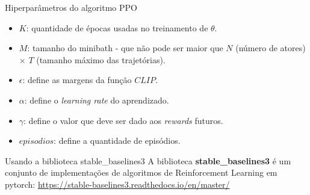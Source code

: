 \documentclass{beamer}
\begin{document}
\begin{frame}{Hiperparâmetros do algoritmo PPO}
	\begin{itemize}
		\item $K$: quantidade de épocas usadas no treinamento de $\theta$.
		\item $M$: tamanho do minibath - que não pode ser maior que $N$ (número de atores) $\times$ $T$ (tamanho máximo das trajetórias).
		\item $\epsilon$: define as margens da função $CLIP$.
		\item $\alpha$: define o \textit{learning rate} do aprendizado. 
		\item $\gamma$: define o valor que deve ser dado aos \textit{rewards} futuros. 
		\item $episodios$: define a quantidade de episódios.  
	\end{itemize}
\end{frame}


\begin{frame}{Usando a biblioteca stable\_baselines3}
	A biblioteca \textbf{stable\_baselines3} é um conjunto de implementações de algoritmos de Reinforcement Learning em pytorch: \href{https://stable-baselines3.readthedocs.io/en/master/}{https://stable-baselines3.readthedocs.io/en/master/} 
	
	\tiny
	
\end{frame}
\end{document}
